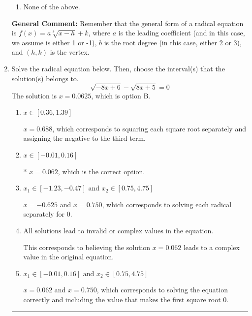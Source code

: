 \documentclass{extbook}[14pt]
\newcommand{\litem}[1]{\item #1

\rule{\textwidth}{0.4pt}}
\begin{document}
\begin{enumerate}
{\begin{enumerate}[label=\Alph*.]
\begin{multicols}{2}
\end{multicols}\item None of the above.\end{enumerate}
\textbf{General Comment:} Remember that the general form of a radical equation is $ f(x) = a \sqrt[b]{x - h} + k $, where $a$ is the leading coefficient (and in this case, we assume is either 1 or -1), $b$ is the root degree (in this case, either 2 or 3), and $(h, k)$ is the vertex.
}
\litem{
Solve the radical equation below. Then, choose the interval(s) that the solution(s) belongs to.
\[ \sqrt{-8 x + 6} - \sqrt{8 x + 5} = 0 \]The solution is \( x = 0.0625 \), which is option B.\begin{enumerate}[label=\Alph*.]
\item \( x \in [0.36,1.39] \)

$x = 0.688$, which corresponds to squaring each square root separately and assigning the negative to the third term.
\item \( x \in [-0.01,0.16] \)

* $x = 0.062$, which is the correct option.
\item \( x_1 \in [-1.23, -0.47] \text{ and } x_2 \in [0.75,4.75] \)

$x = -0.625$ and $x = 0.750$, which corresponds to solving each radical separately for 0.
\item \( \text{All solutions lead to invalid or complex values in the equation.} \)

This corresponds to believing the solution $x = 0.062$ leads to a complex value in the original equation.
\item \( x_1 \in [-0.01, 0.16] \text{ and } x_2 \in [0.75,4.75] \)

$x = 0.062$ and $x = 0.750$, which corresponds to solving the equation correctly and including the value that makes the first square root 0.
\end{enumerate}

}
\end{enumerate}
\end{document}
